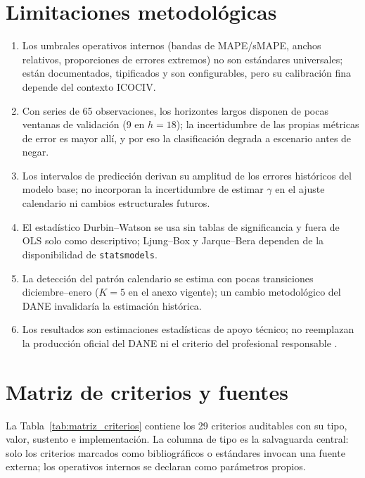 \documentclass[12pt]{article}
\begin{document}
\section{Limitaciones metodol\'ogicas}
\label{sec:limitaciones}

\begin{enumerate}
  \item Los umbrales operativos internos (bandas de MAPE/sMAPE, anchos relativos, proporciones de errores extremos) no son est\'andares universales; est\'an documentados, tipificados y son configurables, pero su calibraci\'on fina depende del contexto ICOCIV.
  \item Con series de 65 observaciones, los horizontes largos disponen de pocas ventanas de validaci\'on (9 en $h=18$); la incertidumbre de las propias m\'etricas de error es mayor all\'i, y por eso la clasificaci\'on degrada a escenario antes de negar.
  \item Los intervalos de predicci\'on derivan su amplitud de los errores hist\'oricos del modelo base; no incorporan la incertidumbre de estimar $\gamma$ en el ajuste calendario ni cambios estructurales futuros.
  \item El estad\'istico Durbin--Watson se usa sin tablas de significancia y fuera de OLS solo como descriptivo; Ljung--Box y Jarque--Bera dependen de la disponibilidad de \texttt{statsmodels}.
  \item La detecci\'on del patr\'on calendario se estima con pocas transiciones diciembre--enero ($K=5$ en el anexo vigente); un cambio metodol\'ogico del DANE invalidar\'ia la estimaci\'on hist\'orica.
  \item Los resultados son estimaciones estad\'isticas de apoyo t\'ecnico; no reemplazan la producci\'on oficial del DANE ni el criterio del profesional responsable \citep{dane2021metodologia}.
\end{enumerate}

\section{Matriz de criterios y fuentes}
\label{sec:matriz}

La Tabla~\ref{tab:matriz_criterios} contiene los 29 criterios auditables con su tipo, valor, sustento e implementaci\'on. La columna de tipo es la salvaguarda central: solo los criterios marcados como bibliogr\'aficos o est\'andares invocan una fuente externa; los operativos internos se declaran como par\'ametros propios.
\end{document}
